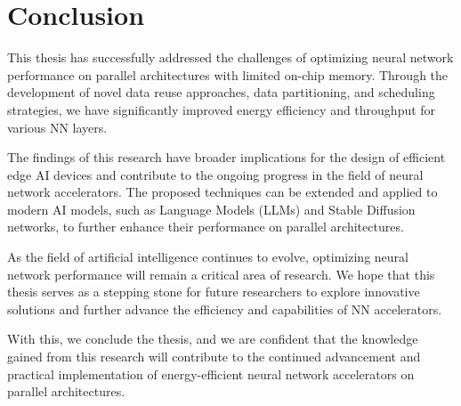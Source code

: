 \section{Conclusion}
This thesis has successfully addressed the challenges of optimizing neural network performance on parallel architectures with limited on-chip memory. Through the development of novel data reuse approaches, data partitioning, and scheduling strategies, we have significantly improved energy efficiency and throughput for various NN layers.

The findings of this research have broader implications for the design of efficient edge AI devices and contribute to the ongoing progress in the field of neural network accelerators. The proposed techniques can be extended and applied to modern AI models, such as Language Models (LLMs) and Stable Diffusion networks, to further enhance their performance on parallel architectures.

As the field of artificial intelligence continues to evolve, optimizing neural network performance will remain a critical area of research. We hope that this thesis serves as a stepping stone for future researchers to explore innovative solutions and further advance the efficiency and capabilities of NN accelerators.

With this, we conclude the thesis, and we are confident that the knowledge gained from this research will contribute to the continued advancement and practical implementation of energy-efficient neural network accelerators on parallel architectures.